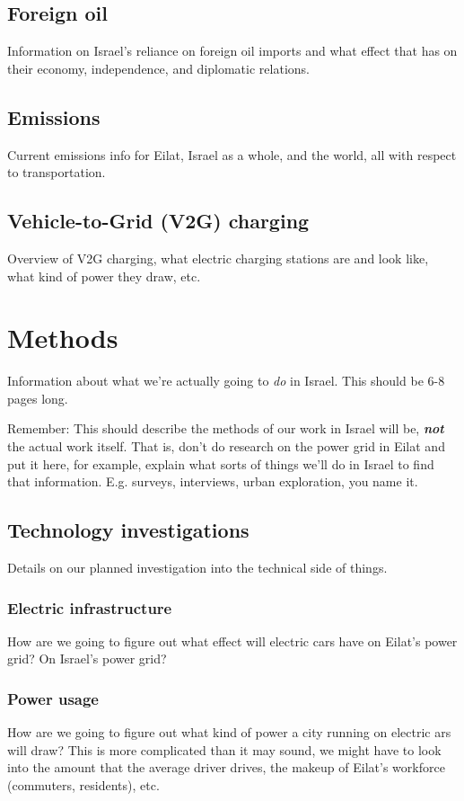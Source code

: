 \documentclass{article}
\begin{document}
\subsection{Foreign oil}
Information on Israel's reliance on foreign oil imports and what effect that has on their economy, independence,
and diplomatic relations.

\subsection{Emissions}
Current emissions info for Eilat, Israel as a whole, and the world, all with respect to transportation.

\subsection{Vehicle-to-Grid (V2G) charging}
Overview of V2G charging, what electric charging stations are and look like, what kind of power they draw, etc.

\newpage
\section{Methods}
Information about what we're actually going to \textit{do} in Israel. This should be 6-8 pages long.

Remember: This should describe the methods of our work in Israel will be, \textbf{\textit{not}} the actual work itself. That is, don't do research on the power grid in Eilat and put it here, for example, explain what sorts of 
things we'll do in Israel to find that information. E.g. surveys, interviews, urban exploration, you name it.

\subsection{Technology investigations}
Details on our planned investigation into the technical side of things. 

\subsubsection{Electric infrastructure}
How are we going to figure out what effect will electric cars have on Eilat's power grid? On Israel's power grid? 

\subsubsection{Power usage}
How are we going to figure out what kind of power a city running on electric ars will draw? This is more
complicated than it may sound, we might have to look into the amount that the average driver drives, the makeup
of Eilat's workforce (commuters, residents), etc.
\end{document}
